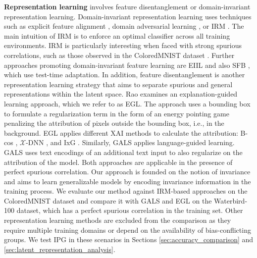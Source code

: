 \textbf{Representation learning} involves feature disentanglement or domain-invariant representation learning.
Domain-invariant representation learning uses techniques such as explicit feature alignment \cite{jin_style_2022, fan_adversarially_2021, chen_domain_2023}, domain adversarial learning \cite{luo_scale_2021, matsuura_domain_2020}, or \ac{IRM} \cite{arjovsky_invariant_2019}. 
The main intuition of \ac{IRM} is to enforce an optimal classifier across all training environments.
IRM is particularly interesting when faced with strong spurious correlations, such as those observed in the ColoredMNIST dataset \cite{arjovsky_invariant_2019}.
Further approaches promoting domain-invariant feature learning are EIIL \cite{creager_environment_2021} and also SFB \cite{eastwood_spuriosity_2023}, which use test-time adaptation.
In addition, feature disentanglement is another representation learning strategy that aims to separate spurious and general representations within the latent space.
%
Rao \cite{rao_studying_2023} examines an 
explanation-guided learning approach, which we refer to as EGL.
The approach uses a bounding box to formulate a regularization term in the form of an energy pointing game penalizing the attribution of pixels outside the bounding box, i.e., in the background.
EGL applies different \ac{XAI} methods to calculate the attribution: B-cos \cite{bohle_b-cos_2022}, $\mathcal{X}$-DNN \cite{hesse_fast_2021}, and IxG \cite{shrikumar_learning_2017}.
Similarly, GALS \cite{petryk_guiding_2022} applies language-guided learning.
GALS uses text encodings of an additional text input to also regularize on the attribution of the model.
Both approaches are applicable in the presence of perfect spurious correlation. 
%
Our approach is founded on the notion of invariance and aims to learn generalizable models by encoding invariance information in the training process.
We evaluate our method against IRM-based approaches on the ColoredMNIST dataset and compare it with GALS and EGL on the Waterbird-100 dataset, which has a perfect spurious correlation in the training set.
Other representation learning methods are excluded from the comparison as they require multiple training domains or depend on the availability of bias-conflicting groups.
%
We test IPG in these scenarios in Sections \ref{sec:accuracy_comparison} and \ref{sec:latent_representation_analysis}.

